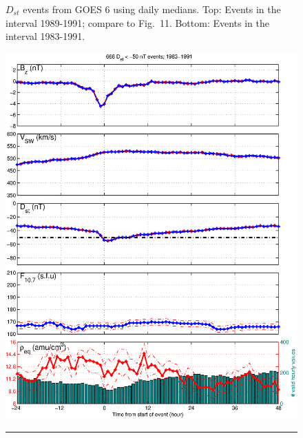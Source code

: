 \documentclass[10pt,twocolumn]{article}
\begin{document}
\begin{figure}[tp!]
\caption{$D_{st}$ events from GOES 6 using daily medians. Top: Events in the interval 1989-1991; compare to \cite{Takahashi2010} Fig.~11. Bottom: Events in the interval 1983-1991.}
\label{DailyAveragedDstEvents}
\end{figure}

\begin{figure}[tp!]
\centering
\includegraphics[scale=0.40]{paperfigures/stormavs-dst.eps}
\rule[1ex]{5cm}{1pt}

\end{figure}
\end{document}
